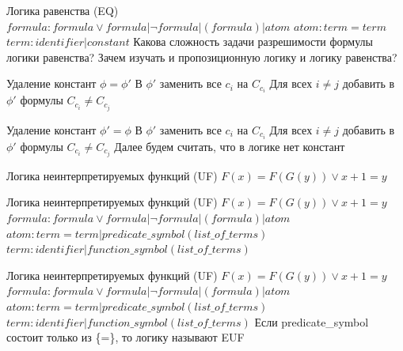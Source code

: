 \documentclass{beamer}
\begin{document}
\begin{frame}{Логика равенства (EQ)}
$formula: formula \vee formula | \lnot formula | (formula) | atom$\newline
$atom: term = term$\newline
$term: identifier | constant$\newline
Какова сложность задачи разрешимости формулы логики равенства?\newline
Зачем изучать и пропозиционную логику и логику равенства?\newline
\end{frame}

\begin{frame}{Удаление констант}
$\phi = \phi'$\newline
В $\phi'$ заменить все $c_i$ на $C_{c_i}$\newline
Для всех $i \neq j$ добавить в $\phi'$ формулы $C_{c_i} \neq C_{c_j}$
\end{frame}

\begin{frame}{Удаление констант}
$\phi' = \phi$\newline
В $\phi'$ заменить все $c_i$ на $C_{c_i}$\newline
Для всех $i \neq j$ добавить в $\phi'$ формулы $C_{c_i} \neq C_{c_j}$\newline
Далее будем считать, что в логике нет констант
\end{frame}

\begin{frame}{Логика неинтерпретируемых функций (UF)}
$F(x) = F (G(y)) \vee x + 1 = y$\newline
\end{frame}

\begin{frame}{Логика неинтерпретируемых функций (UF)}
$F(x) = F (G(y)) \vee x + 1 = y$\newline
$formula: formula \vee formula | \lnot formula | (formula) | atom$\newline
$atom: term = term| predicate\_symbol(list\_of\_terms)$\newline
$term: identifier | function\_symbol(list\_of\_terms)$\newline
\end{frame}

\begin{frame}{Логика неинтерпретируемых функций (UF)}
$F(x) = F (G(y)) \vee x + 1 = y$\newline
$formula: formula \vee formula | \lnot formula | (formula) | atom$\newline
$atom: term = term| predicate\_symbol(list\_of\_terms)$\newline
$term: identifier | function\_symbol(list\_of\_terms)$\newline
Если predicate\_symbol состоит только из \{=\}, то логику называют EUF
\end{frame}
\end{document}
